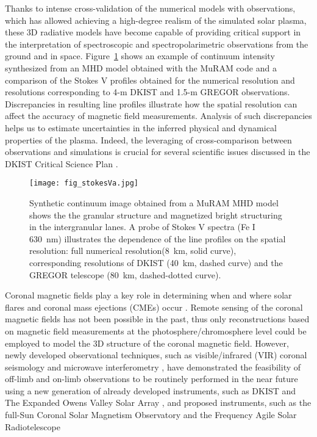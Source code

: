\documentclass[]{article}
\begin{document}
Thanks to intense cross-validation of the numerical models with observations, which has allowed achieving a high-degree realism of the simulated solar plasma, these 3D radiative models have become capable of providing critical support in the interpretation of spectroscopic and spectropolarimetric observations from the ground and in space. Figure~\ref{fig:stokesV} shows an example of continuum intensity synthesized from an MHD model \citep{Rempel2014} obtained with the MuRAM code \citep{Vogler2005} and a comparison of the Stokes V profiles obtained for the numerical resolution and resolutions corresponding to 4-m DKIST and 1.5-m GREGOR observations. Discrepancies in resulting line profiles illustrate how the spatial resolution can affect the accuracy of magnetic field measurements. Analysis of such discrepancies helps us to estimate uncertainties in the inferred physical and dynamical properties of the plasma. Indeed, the leveraging of cross-comparison between observations and simulations is crucial for several scientific issues discussed in the DKIST Critical Science Plan \citep{Rast2020}.

\begin{figure}[t] %
    \centering
    \texttt{[image: fig\_stokesVa.jpg]}
    \caption{Synthetic continuum image obtained from a MuRAM MHD model \citep{Rempel2014} shows the the granular structure and magnetized bright structuring in the intergranular lanes. A probe of Stokes V spectra (Fe I 630~nm) illustrates the dependence of the line profiles on the spatial resolution:  full numerical resolution(8~km, solid curve), corresponding resolutions of DKIST (40~km, dashed curve) and the GREGOR telescope (80~km, dashed-dotted curve).
}
    \label{fig:stokesV}
\end{figure}
Coronal magnetic fields play a key role in determining when and where solar flares and coronal mass ejections (CMEs) occur \citep{Gibson2020}. Remote sensing of the coronal magnetic fields has not been possible in the past, thus only reconstructions based on magnetic field measurements at the photosphere/chromosphere level could be employed to model the 3D structure of the coronal magnetic field. However, newly developed observational techniques, such as visible/infrared (VIR) coronal seismology \citep{Yang2020a, Yang2020b} and microwave interferometry \citep{Fleishman2020, Chen2020}, have demonstrated the feasibility of off-limb and on-limb observations to be routinely performed in the near future using a new generation of already developed instruments, such as DKIST and The Expanded Owens Valley Solar Array \citep[EOVSA, ][]{EOVSA}, and proposed  instruments, such as the full-Sun Coronal Solar Magnetism Observatory \citep[COSMO, ][]{Tomczyk} and the Frequency Agile Solar Radiotelescope \citep[FASR, ][]{FASR}
\end{document}
